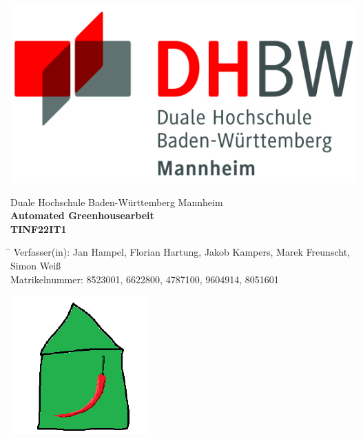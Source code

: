 \begin{titlepage}
    \begin{minipage}{\textwidth}
            \vspace{-2cm}
            \noindent \includegraphics[scale=0.5]{images/logo.jpg}
    \end{minipage}
    \vspace{1em}
    \begin{center}
        {\textsf{\large Duale Hochschule Baden-W\"urttemberg Mannheim}}\\[4em]
        {\textsf{\textbf{\large{Automated Greenhouse}arbeit}}}\\[6mm]
        {\textsf{\textbf{\large{}TINF22IT1}}}\\[4em]
        
        \begin{minipage}{\textwidth}
            \begin{tabbing}
             \hspace{0.85cm}\=\kill
            Verfasser(in):  Jan Hampel, Florian Hartung, Jakob Kampers, Marek Freunscht, Simon Weiß\\[1.5mm]
            Matrikelnummer:  8523001, 6622800, 4787100, 9604914, 8051601\\[4em]
            \end{tabbing}
            \noindent 
            \begin{center}
                \includegraphics[scale=0.5]{images/GH_logo.png}
            \end{center}
        
        \end{minipage}
    \end{center}
    \end{titlepage}